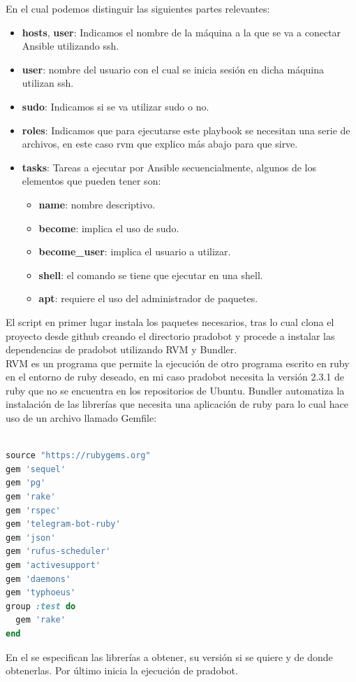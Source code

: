 En el cual podemos distinguir las siguientes partes relevantes:
\begin{itemize}

\item \textbf{hosts}, \textbf{user}: Indicamos el nombre de la máquina a la que se va a conectar Ansible utilizando ssh.
\item \textbf{user}: nombre del usuario con el cual se inicia sesión en dicha máquina utilizan ssh.
\item \textbf{sudo}: Indicamos si se va utilizar sudo o no.
\item \textbf{roles}:  Indicamos que para ejecutarse este playbook se necesitan una serie de archivos, en este caso rvm que explico más abajo para que sirve.
\item \textbf{tasks}: Tareas a ejecutar por Ansible secuencialmente, algunos de los elementos que pueden tener son:
\begin{itemize}
\item \textbf{name}: nombre descriptivo.
\item \textbf{become}: implica el uso de sudo.
\item \textbf{become\_user}: implica el usuario a utilizar.
\item \textbf{shell}: el comando se tiene que ejecutar en una shell.
\item \textbf{apt}: requiere el uso del administrador de paquetes.
\end{itemize}

\end{itemize}

El script en primer lugar instala los paquetes necesarios, tras lo cual clona el proyecto desde github creando el directorio pradobot y procede a instalar las dependencias de pradobot utilizando RVM y Bundler.\\
RVM es un programa que permite la ejecución de otro programa escrito en ruby en el entorno de ruby deseado, en mi caso pradobot necesita la versión 2.3.1 de ruby que no se encuentra en los repositorios de Ubuntu. Bundler automatiza la instalación de las librerías que necesita una aplicación de ruby para lo cual hace uso de un archivo llamado Gemfile:
\begin{lstlisting}[language=Ruby]

source "https://rubygems.org"
gem 'sequel'
gem 'pg'
gem 'rake'
gem 'rspec'
gem 'telegram-bot-ruby'
gem 'json'
gem 'rufus-scheduler'
gem 'activesupport'
gem 'daemons'
gem 'typhoeus'
group :test do
  gem 'rake'
end
\end{lstlisting}
En el se especifican las librerías a obtener, su versión si se quiere y de donde obtenerlas. Por último inicia la ejecución de pradobot.

